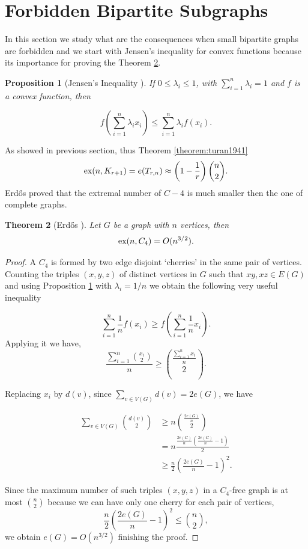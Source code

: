 \documentclass[12pt,twoside,a4paper,bibliography=totocnumbered]{book}
\numberwithin{equation}{section}
\newtheorem{theorem}             {Theorem}[section]
\newtheorem{proposition}[theorem] {Proposition}
\theoremstyle{remark}
\def\ex{\mathop{\text{\rm ex}}\nolimits}
\begin{document}
\section{Forbidden Bipartite Subgraphs}
In this section we study what are the consequences when small bipartite graphs are forbidden and we start with Jensen's inequality for convex functions because its importance for proving the Theorem \ref{theorem: Erdos,1938}.
\begin{proposition}[{Jensen's Inequality \cite{Je06}}]\label{prep:jensen}
 If $0\leq \lambda_i \leq 1$, with $\sum_{i=1}^n \lambda_i = 1$ and $f$ is a convex function, then

$$
f \left( \sum_{i=1}^n \lambda_i x_i\right) \leq \sum_{i=1}^n \lambda_i f (x_i).
$$
\end{proposition}
As showed in previous section, thus Theorem \ref{theorem:turan1941}
$$ \ex (n,K_{r+1}) = e(T_{r,n}) \approx \left( 1-\frac{1}{r}\right) \binom{n}{2} .$$
Erd\H{o}s proved that the extremal number of $C-4$ is much smaller then the one of complete graphs.
 
\begin{theorem}[{Erd\H{o}s \cite{Er38}}] \label{theorem: Erdos,1938} Let $G$ be a graph with $n$ vertices, then
$$\ex(n,C_4) = O(n^{3/2}).$$
\end{theorem}

\begin{proof}
A $C_4$ is formed by two edge disjoint `cherries' in the same pair of vertices. Counting the triples $(x,y,z)$ of distinct vertices in $G$ such that $xy, xz \in E(G)$ and using Proposition \ref{prep:jensen} with $\lambda_i = 1/n$ we obtain the following very useful inequality

$$ \sum_{i=1}^n \frac{1}{n} f\left(x_i\right) \geq f\left(\sum_{i=1}^n \frac{1}{n} x_i\right).$$
Applying it we have,
$$ \frac{\sum_{i=1}^n \binom{x_i}{2}}{n} \geq \binom{\frac{\sum_{i=1}^n x_i}{n}}{2}.$$

Replacing $x_i$ by $d(v)$, since $\sum_{v \in V(G)} d(v) = 2e(G)$, we have

\begin{align*}
\sum_{v \in V(G)} \binom{d(v)}{2} &\geq n \binom{\frac{2e(G)}{n}}{2}\\
&= n\frac{\frac{2e(G)}{n}\left( \frac{2e(G)}{n}-1\right)}{2} \\
&\geq \frac{n}{2} \left( \frac{2e(G)}{n} - 1 \right)^2.
\end{align*}

Since the maximum number of such triples $(x,y,z)$ in a $C_4$-free graph is at most $\binom{n}{2}$ because we can have only one cherry for each pair of vertices,
$$ \frac{n}{2}\left(\frac{2e(G)}{n} - 1\right)^2 \leq \binom{n}{2},$$
we obtain $e(G) = O(n^{3/2})$ finishing the proof.
\end{proof}
\end{document}
